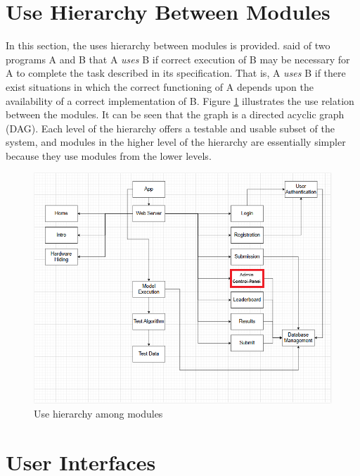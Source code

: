 \documentclass[12pt, titlepage]{article}
\begin{document}
\section{Use Hierarchy Between Modules} \label{SecUse}

In this section, the uses hierarchy between modules is
provided. \citet{Parnas1978} said of two programs A and B that A {\em uses} B if
correct execution of B may be necessary for A to complete the task described in
its specification. That is, A {\em uses} B if there exist situations in which
the correct functioning of A depends upon the availability of a correct
implementation of B.  Figure \ref{FigUH} illustrates the use relation between
the modules. It can be seen that the graph is a directed acyclic graph
(DAG). Each level of the hierarchy offers a testable and usable subset of the
system, and modules in the higher level of the hierarchy are essentially simpler
because they use modules from the lower levels.

\begin{figure}[H]
\centering
\includegraphics[width=1.0\textwidth]{Use_Hierarchy.png}
\caption{Use hierarchy among modules}
\label{FigUH}
\end{figure}


\section{User Interfaces} \label{UI}
\end{document}
